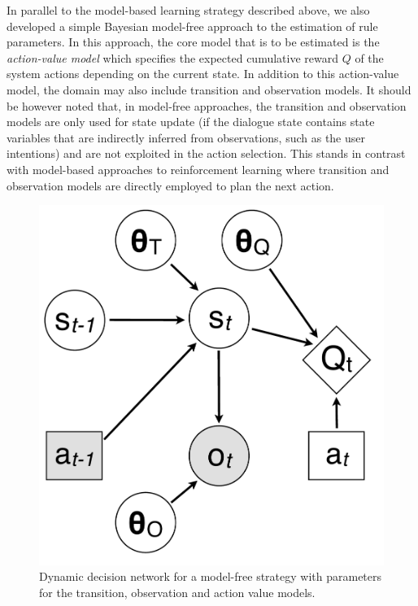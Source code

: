 In parallel to the model-based learning strategy described above, we also developed a simple Bayesian model-free approach to the estimation of rule parameters.  In this approach, the core model that is to be estimated is the \textit{action-value model} which specifies the expected cumulative reward $Q$ of the system actions depending on the current state. In addition to this action-value model, the domain may also include transition and observation models. It should be however noted that, in model-free approaches, the transition and observation models are only used for state update (if the dialogue state contains state variables that are indirectly inferred from observations, such as the user intentions) and are not exploited in the action selection.  This stands in contrast with model-based approaches to reinforcement learning where transition and observation  models are directly employed to plan the next action.

\begin{figure}
\vspace{-2mm}
\centering
\includegraphics[scale=0.25]{imgs/modelfreediagram.pdf}
\vspace{-2mm}
\caption{Dynamic decision network for a model-free strategy with parameters for the transition, observation and action value models.}
\label{fig:modelfreediagram}
\end{figure}

